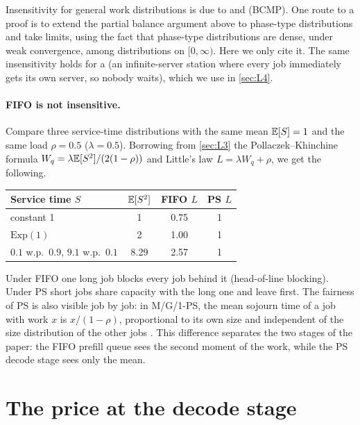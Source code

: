 \begin{remark}
Insensitivity for general work distributions is due to \cite{kelly1979} and
\cite{bcmp1975} (BCMP). One route to a proof is to extend the partial balance argument
above to phase-type distributions and take limits, using the fact that phase-type
distributions are dense, under weak convergence, among distributions on $[0,\infty)$.
Here we only cite it.
The same insensitivity holds for a  (an infinite-server station
where every job immediately gets its own server, so nobody waits), which we use in
\cref{sec:L4}.
\end{remark}

\paragraph{FIFO is not insensitive.} Compare three service-time distributions with the
same mean $\mathbb{E}[S]=1$ and the same load $\rho=0.5$ ($\lambda=0.5$). Borrowing from
\cref{sec:L3} the Pollaczek--Khinchine formula $W_q=\lambda\mathbb{E}[S^2]/(2(1-\rho))$ and
Little's law $L=\lambda W_q+\rho$, we get the following.
\begin{center}\small
\begin{tabular}{@{}lccc@{}}
\toprule
Service time $S$ & $\mathbb{E}[S^2]$ & FIFO $L$ & PS $L$ \\
\midrule
constant 1 & 1 & 0.75 & 1 \\
$\mathrm{Exp}(1)$ & 2 & 1.00 & 1 \\
$0.1$ w.p.\ $0.9$, $9.1$ w.p.\ $0.1$ & 8.29 & 2.57 & 1 \\
\bottomrule
\end{tabular}
\end{center}
Under FIFO one long job blocks every job behind it (head-of-line blocking). Under PS
short jobs share capacity with the long one and leave first.
The fairness of PS is also visible job by job: in M/G/1-PS, the mean sojourn time of
a job with work $x$ is $x/(1-\rho)$, proportional to its own size and independent of
the size distribution of the other jobs \cite{kleinrock1976}.
This difference separates the two stages of the paper: the FIFO prefill queue sees the
second moment of the work, while the PS decode stage sees only the mean.

\section{The price at the decode stage}

